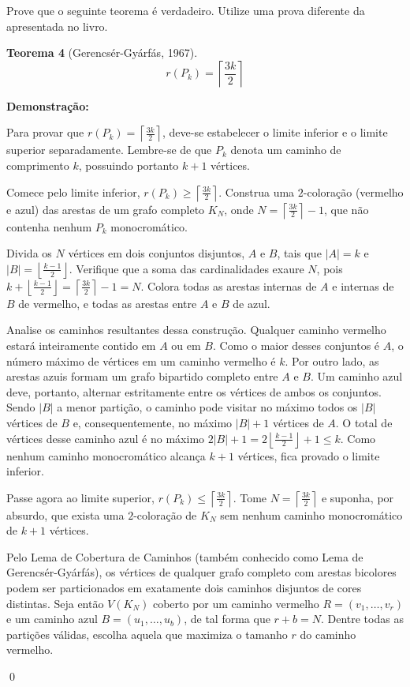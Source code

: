 \documentclass[12pt]{article}
\newenvironment{problem}[2][Exercício]{\begin{trivlist}
\item[\hskip \labelsep {\bfseries #1}\hskip \labelsep {\bfseries #2.}]}{\end{trivlist}}
\newenvironment{sol}
    {\textbf{Demonstração:}\emph{}
    }
    {
    \qed
    }
\begin{document}
\begin{problem}{7}
    Prove que o seguinte teorema é verdadeiro. Utilize uma prova diferente da apresentada no livro.
    
    \textbf{Teorema 4} (Gerencsér-Gyárfás, 1967).
    \[
        r(P_k) = \left\lceil \frac{3k}{2} \right\rceil
    \]
\end{problem}
\begin{sol}
    Para provar que $r(P_k) = \left\lceil \frac{3k}{2} \right\rceil$, deve-se estabelecer o limite inferior e o limite superior separadamente. Lembre-se de que $P_k$ denota um caminho de comprimento $k$, possuindo portanto $k+1$ vértices.

    Comece pelo limite inferior, $r(P_k) \ge \left\lceil \frac{3k}{2} \right\rceil$. Construa uma $2$-coloração (vermelho e azul) das arestas de um grafo completo $K_N$, onde $N = \left\lceil \frac{3k}{2} \right\rceil - 1$, que não contenha nenhum $P_k$ monocromático.
    
    Divida os $N$ vértices em dois conjuntos disjuntos, $A$ e $B$, tais que $|A| = k$ e $|B| = \left\lfloor \frac{k-1}{2} \right\rfloor$. Verifique que a soma das cardinalidades exaure $N$, pois $k + \left\lfloor \frac{k-1}{2} \right\rfloor = \left\lceil \frac{3k}{2} \right\rceil - 1 = N$. Colora todas as arestas internas de $A$ e internas de $B$ de vermelho, e todas as arestas entre $A$ e $B$ de azul.
    
    Analise os caminhos resultantes dessa construção. Qualquer caminho vermelho estará inteiramente contido em $A$ ou em $B$. Como o maior desses conjuntos é $A$, o número máximo de vértices em um caminho vermelho é $k$. Por outro lado, as arestas azuis formam um grafo bipartido completo entre $A$ e $B$. Um caminho azul deve, portanto, alternar estritamente entre os vértices de ambos os conjuntos. Sendo $|B|$ a menor partição, o caminho pode visitar no máximo todos os $|B|$ vértices de $B$ e, consequentemente, no máximo $|B| + 1$ vértices de $A$. O total de vértices desse caminho azul é no máximo $2|B| + 1 = 2\left\lfloor \frac{k-1}{2} \right\rfloor + 1 \le k$. Como nenhum caminho monocromático alcança $k+1$ vértices, fica provado o limite inferior.

    Passe agora ao limite superior, $r(P_k) \le \left\lceil \frac{3k}{2} \right\rceil$. Tome $N = \left\lceil \frac{3k}{2} \right\rceil$ e suponha, por absurdo, que exista uma $2$-coloração de $K_N$ sem nenhum caminho monocromático de $k+1$ vértices.
    
    Pelo Lema de Cobertura de Caminhos (também conhecido como Lema de Gerencsér-Gyárfás), os vértices de qualquer grafo completo com arestas bicolores podem ser particionados em exatamente dois caminhos disjuntos de cores distintas. Seja então $V(K_N)$ coberto por um caminho vermelho $R = (v_1, \dots, v_r)$ e um caminho azul $B = (u_1, \dots, u_b)$, de tal forma que $r + b = N$. Dentre todas as partições válidas, escolha aquela que maximiza o tamanho $r$ do caminho vermelho.
    

\end{sol}
\end{document}
